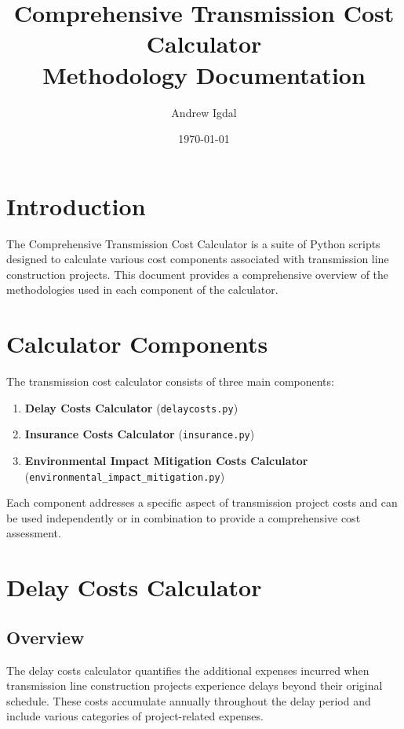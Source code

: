 \documentclass[12pt]{article}
\title{Comprehensive Transmission Cost Calculator\\Methodology Documentation}
\author{Andrew Igdal}
\date{\today}
\begin{document}
\maketitle

\tableofcontents

\section{Introduction}

The Comprehensive Transmission Cost Calculator is a suite of Python scripts designed to calculate various cost components associated with transmission line construction projects. This document provides a comprehensive overview of the methodologies used in each component of the calculator.

\section{Calculator Components}

The transmission cost calculator consists of three main components:

\begin{enumerate}
    \item \textbf{Delay Costs Calculator} (\texttt{delaycosts.py})
    \item \textbf{Insurance Costs Calculator} (\texttt{insurance.py})
    \item \textbf{Environmental Impact Mitigation Costs Calculator} (\texttt{environmental\_impact\_mitigation.py})
\end{enumerate}

Each component addresses a specific aspect of transmission project costs and can be used independently or in combination to provide a comprehensive cost assessment.

\section{Delay Costs Calculator}

\subsection{Overview}
The delay costs calculator quantifies the additional expenses incurred when transmission line construction projects experience delays beyond their original schedule. These costs accumulate annually throughout the delay period and include various categories of project-related expenses.
\end{document}
